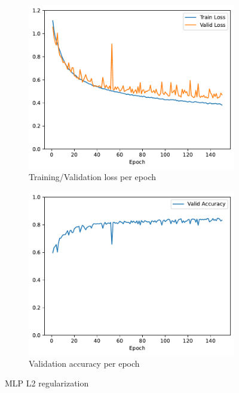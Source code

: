 \documentclass[11pt]{article}
\begin{document}
\begin{figure}[h!]
\centering
\begin{subfigure}{.5\textwidth}
  \centering
  \includegraphics[width=.9\linewidth]{plots/mlp-training-loss-batch-256-lr-0.1-epochs-150-hidden-200-dropout-0-l2-0.0001-layers-1-act-relu-opt-sgd.pdf}
  \caption{Training/Validation loss per epoch}
\end{subfigure}%
\begin{subfigure}{.5\textwidth}
  \centering
  \includegraphics[width=.9\linewidth]{plots/mlp-validation-accuracy-batch-256-lr-0.1-epochs-150-hidden-200-dropout-0-l2-0.0001-layers-1-act-relu-opt-sgd}
  \caption{Validation accuracy per epoch}
\end{subfigure}
\caption{MLP L2 regularization}
\label{fig:MLP_L2_regularization}
\end{figure}
\end{document}
